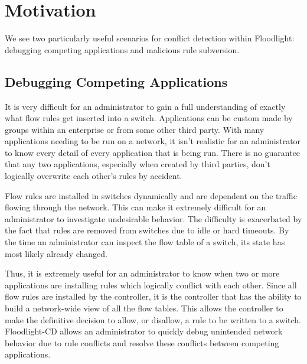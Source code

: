 \section{Motivation}
\label{sec:motivation}

We see two particularly useful scenarios for conflict detection within Floodlight: debugging competing applications and malicious rule subversion.

\subsection{Debugging Competing Applications}
It is very difficult for an administrator to gain a full understanding of exactly what flow rules get inserted into a switch. 
Applications can be custom made by groups within an enterprise or from some other third party.
With many applications needing to be run on a network, it isn't realistic for an administrator to know every detail of every application that is being run.
There is no guarantee that any two applications, especially when created by third parties, don't logically overwrite each other's rules by accident.

Flow rules are installed in switches dynamically and are dependent on the traffic flowing through the network.
This can make it extremely difficult for an administrator to investigate undesirable behavior.
The difficulty is exacerbated by the fact that rules are removed from switches due to idle or hard timeouts.
By the time an administrator can inspect the flow table of a switch, its state has most likely already changed.

Thus, it is extremely useful for an administrator to know when two or more applications are installing rules which logically conflict with each other.
Since all flow rules are installed by the controller, it is the controller that has the ability to build a network-wide view of all the flow tables.
This allows the controller to make the definitive decision to allow, or disallow, a rule to be written to a switch.
Floodlight-CD allows an administrator to quickly debug unintended network behavior due to rule conflicts and resolve these conflicts between competing applications.

